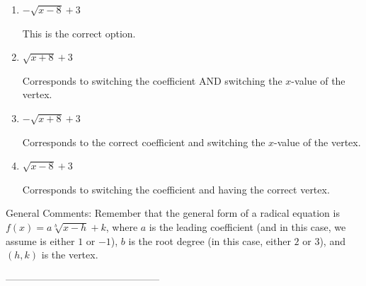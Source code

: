\documentclass{article}[10pt]
\begin{document}
\begin{enumerate}[label=\Alph*.] 
\item $ - \sqrt{x - 8} + 3 $ 

 This is the correct option. 
\item $ \sqrt{x + 8} + 3 $ 

 Corresponds to switching the coefficient AND switching the $x$-value of the vertex. 
\item $ - \sqrt{x + 8} + 3 $ 

 Corresponds to the correct coefficient and switching the $x$-value of the vertex. 
\item $ \sqrt{x - 8} + 3 $ 

 Corresponds to switching the coefficient and having the correct vertex. 
\end{enumerate} 
 
General Comments: Remember that the general form of a radical equation is $ f(x) = a \sqrt[b]{x - h} + k$, where $a$ is the leading coefficient (and in this case, we assume is either $1$ or $-1$), $b$ is the root degree (in this case, either $2$ or $3$), and $(h, k)$ is the vertex.

-----------------------------------------------
\end{document}
